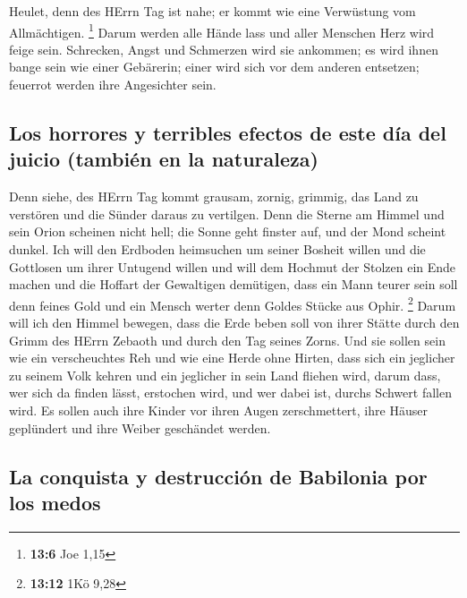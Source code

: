 Heulet, denn des HErrn Tag ist nahe; er kommt wie eine
Verwüstung vom Allmächtigen. \footnote{\textbf{13:6} Joe 1,15}
 Darum werden alle Hände lass und aller Menschen Herz wird
feige sein.  Schrecken, Angst und Schmerzen wird sie
ankommen; es wird ihnen bange sein wie einer Gebärerin; einer wird sich
vor dem anderen entsetzen; feuerrot werden ihre Angesichter sein.

\hypertarget{los-horrores-y-terribles-efectos-de-este-duxeda-del-juicio-tambiuxe9n-en-la-naturaleza}{%
\subsection{Los horrores y terribles efectos de este día del juicio
(también en la
naturaleza)}\label{los-horrores-y-terribles-efectos-de-este-duxeda-del-juicio-tambiuxe9n-en-la-naturaleza}}

 Denn siehe, des HErrn Tag kommt grausam, zornig, grimmig,
das Land zu verstören und die Sünder daraus zu vertilgen.
 Denn die Sterne am Himmel und sein Orion scheinen nicht
hell; die Sonne geht finster auf, und der Mond scheint dunkel.
 Ich will den Erdboden heimsuchen um seiner Bosheit
willen und die Gottlosen um ihrer Untugend willen und will dem Hochmut
der Stolzen ein Ende machen und die Hoffart der Gewaltigen demütigen,
 dass ein Mann teurer sein soll denn feines Gold und ein
Mensch werter denn Goldes Stücke aus Ophir. \footnote{\textbf{13:12} 1Kö
  9,28}  Darum will ich den Himmel bewegen, dass die Erde
beben soll von ihrer Stätte durch den Grimm des HErrn Zebaoth und durch
den Tag seines Zorns.  Und sie sollen sein wie ein
verscheuchtes Reh und wie eine Herde ohne Hirten, dass sich ein
jeglicher zu seinem Volk kehren und ein jeglicher in sein Land fliehen
wird,  darum dass, wer sich da finden lässt, erstochen
wird, und wer dabei ist, durchs Schwert fallen wird.  Es
sollen auch ihre Kinder vor ihren Augen zerschmettert, ihre Häuser
geplündert und ihre Weiber geschändet werden.

\hypertarget{la-conquista-y-destrucciuxf3n-de-babilonia-por-los-medos}{%
\subsection{La conquista y destrucción de Babilonia por los
medos}\label{la-conquista-y-destrucciuxf3n-de-babilonia-por-los-medos}}

